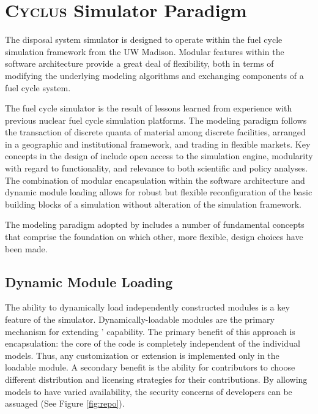 \section{\textsc{Cyclus} Simulator Paradigm }

The \Cyder disposal system simulator is designed to operate within the \Cyclus 
fuel cycle simulation framework \cite{wilson_cyclus:_2012} from the \gls{UW} 
Madison.  Modular features within the \Cyclus software architecture provide 
a great deal of flexibility, both in terms of modifying the underlying modeling 
algorithms and exchanging components of a fuel cycle system.

The \Cyclus fuel cycle simulator is the  result of lessons learned 
from experience with previous nuclear fuel cycle simulation platforms.  
The modeling paradigm follows the transaction of discrete quanta of 
material among discrete facilities, arranged in a geographic and 
institutional framework, and trading in
flexible markets. Key concepts in the design of \Cyclus include open
access to the simulation engine, modularity with regard to
functionality, and relevance to both scientific and policy
analyses. The combination of modular encapsulation within the
software architecture and dynamic module loading allows for robust but 
flexible reconfiguration of the basic building blocks of a simulation 
without alteration of the simulation framework.  

The modeling paradigm adopted by \Cyclus includes a number of
fundamental concepts that comprise the foundation on which other, more
flexible, design choices have been made. 

\subsection{Dynamic Module Loading}

The ability to dynamically load independently constructed modules is a
key feature of the \Cyclus simulator. Dynamically-loadable modules are
the primary mechanism for extending \Cyclus' capability. The primary
benefit of this approach is encapsulation: the core of the code is
completely independent of the individual models. Thus, any
customization or extension is implemented only in the loadable
module. A secondary benefit is the ability for
contributors to choose different distribution and licensing strategies
for their contributions. By allowing models to have varied
availability, the security concerns of developers can be
assuaged (See Figure \ref{fig:repo}). 

